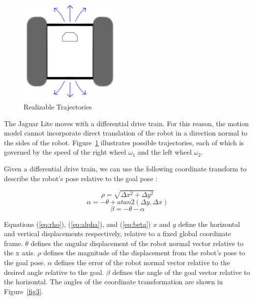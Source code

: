 \documentclass[conference]{IEEEtran}
\begin{document}
\begin{figure}[!h]
\centering
\includegraphics[width =2in]{pic1.png}
\caption{Realizable Trajectories}
\label{fig2}
\end{figure}

The Jaguar Lite moves with a differential drive train.  For this reason, the motion model cannot 
incorporate direct translation of the robot in a direction normal to the sides of
the robot. Figure~\ref{fig2} illustrates possible trajectories, each of which is 
governed by the speed of the right wheel $\omega_1$ and the left wheel $\omega_2$.


Given a differential drive train, we can use the following coordinate transform 
to describe the robot's pose relative to the goal pose \cite{Textbook}:

\begin{equation} \label{eq:rho}
\rho = \sqrt{\Delta x^2 + \Delta y^2}
\end{equation}
\begin{equation} \label{eq:alpha}
\alpha = -\theta + atan2(\Delta y, \Delta x)
\end{equation}
\begin{equation} \label{eq:beta}
\beta = -\theta -\alpha
\end{equation}

Equations (\ref{eq:rho}), (\ref{eq:alpha}), and (\ref{eq:beta}) $x$ and $y$ define the horizontal and vertical displacements
respectively, relative to a fixed global coordinate frame.  $\theta$ defines the 
angular displacement of the robot normal vector relative to the x axis.  
$\rho$ defines the magnitude of the displacement from the robot's pose to the 
goal pose.  $\alpha$ defines the error of the robot normal vector relative to 
the desired angle relative to the goal.  $\beta$ defines the angle of the goal vector 
relative to the horizontal.  The angles of the coordinate transformation are shown in Figure~\ref{fig3}. 
\end{document}
